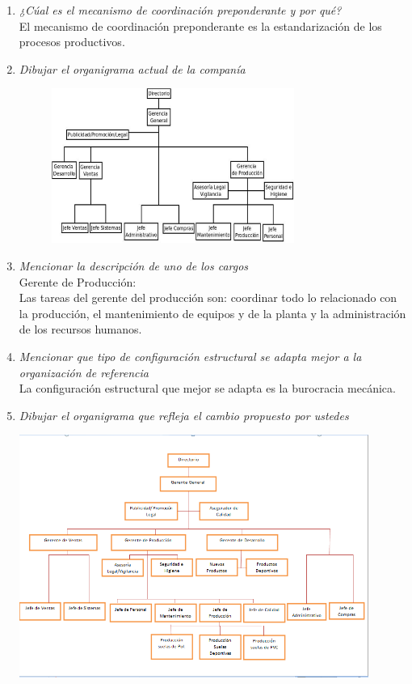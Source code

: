 \documentclass[a4paper,10pt]{article}
\begin{document}
\begin{enumerate}
			
			\item \textit{¿Cúal es el mecanismo de coordinación preponderante y por qué?}\\
			El mecanismo de coordinación preponderante es la estandarización de los procesos productivos.\\
						
			\item \textit{Dibujar el organigrama actual de la companía}\\
			\begin{figure}[!h]
			\includegraphics[width=0.75\textwidth]{imagenes/orgaLosGringos.png}
			\end{figure}			
			\item \textit{Mencionar la descripción de uno de los cargos}\\
			Gerente de Producción:\\

			Las tareas del gerente del producción son: coordinar todo lo relacionado con la producción, el mantenimiento de equipos y de la planta y la administración de los recursos humanos.
			
			\item \textit{Mencionar que tipo de configuración estructural se adapta mejor a la organización de referencia}\\
			La configuración estructural que mejor se adapta es la burocracia mecánica.

						
			\item \textit{Dibujar el organigrama que refleja el cambio propuesto por ustedes}
		
			
				\includegraphics[width=0.9\textwidth]{imagenes/SolucionPropuestaGringo.png}
				

\end{enumerate}
\end{document}
